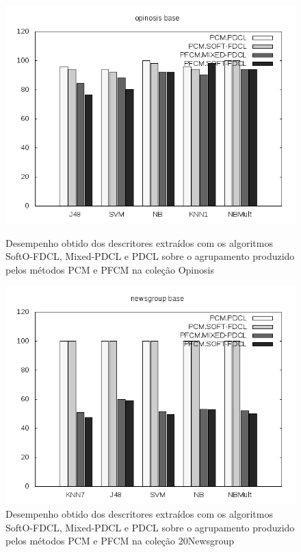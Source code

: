 \begin{figure}[!htp] \centering 
   \begin{minipage}{0.48\textwidth} 
     \centering
    \includegraphics[width=1.0\columnwidth]{assets/pdcl/opinosis} 
    \caption{Desempenho obtido dos descritores extraídos com os algoritmos SoftO-FDCL, Mixed-PDCL e
    PDCL sobre o agrupamento produzido pelos métodos PCM e PFCM na coleção Opinosis} 
  \label{fig:pfcmopinosis}
  \end{minipage}\hfill 
  \begin{minipage}{0.48\textwidth} \centering
    \includegraphics[width=1.0\columnwidth]{assets/pdcl/newsgroup} 
    \caption{Desempenho obtido dos descritores extraídos com os algoritmos SoftO-FDCL, Mixed-PDCL e
    PDCL sobre o agrupamento produzido pelos métodos PCM e PFCM na coleção 20Newsgroup} 
     \label{fig:pfcm20news} 
   \end{minipage} 
\end{figure}


